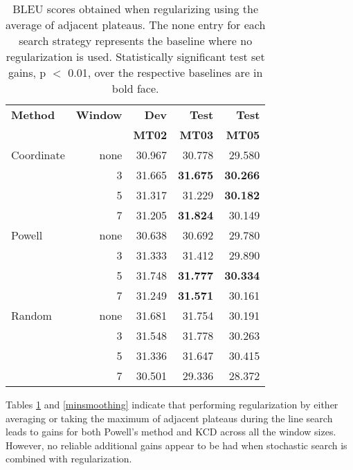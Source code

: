 \documentclass[11pt]{article}
\begin{document}
\begin{table}
\begin{center}
\begin{tabular}{|l|rrrr|}
\hline \bf Method  & \bf Window & \bf Dev & \bf Test & \bf Test \\
                   &            & \bf MT02 & \bf MT03 & \bf MT05 \\ \hline
Coordinate & none &  30.967 & 30.778 & 29.580 \\
           & 3  & 31.665  & {\bf 31.675}  & {\bf 30.266} \\
           & 5  & 31.317  & 31.229  & {\bf 30.182}  \\
           & 7  & 31.205  & {\bf 31.824}  & 30.149 \\ \hline
Powell     & none & 30.638 & 30.692  & 29.780 \\ 
           & 3  & 31.333  & 31.412  & 29.890 \\
           & 5  & 31.748  & {\bf 31.777} &  {\bf 30.334} \\
           & 7  & 31.249  & {\bf 31.571} &  30.161 \\ \hline
Random     & none & 31.681 & 31.754 & 30.191 \\
           & 3  & 31.548  & 31.778  & 30.263 \\
           & 5  & 31.336  & 31.647  & 30.415  \\
           & 7  & 30.501  & 29.336  & 28.372 \\
\hline
\end{tabular}
\end{center}
\caption{
\label{avgsmoothing}
BLEU scores obtained when regularizing using the average of adjacent plateaus. 
The none entry for each search strategy represents the baseline where no regularization is used. Statistically significant test set gains, p \mbox{$<$} 0.01, over the respective baselines are in bold face. 
}
\end{table}

Tables \ref{avgsmoothing} and \ref{minsmoothing} indicate that performing regularization by either averaging or taking the maximum of adjacent plateaus during the line search leads to gains for both Powell's method and KCD across all the window sizes. However, no reliable additional gains appear to be had when stochastic search is combined with regularization.
\end{document}
